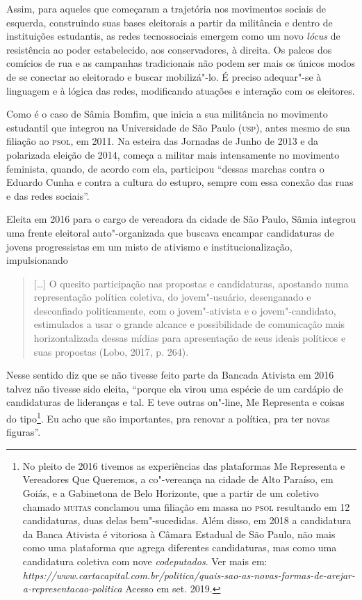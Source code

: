 Assim, para aqueles que começaram a trajetória nos movimentos sociais de
esquerda, construindo suas bases eleitorais a partir da militância e
dentro de instituições estudantis, as redes tecnossociais emergem como
um novo \emph{lócus} de resistência ao poder estabelecido, aos
conservadores, à direita. Os palcos dos comícios de rua e as campanhas
tradicionais não podem ser mais os únicos modos de se conectar ao
eleitorado e buscar mobilizá"-lo. É preciso adequar"-se à linguagem e à
lógica das redes, modificando atuações e interação com os eleitores.

Como é o caso de Sâmia Bomfim, que inicia a sua militância no movimento
estudantil que integrou na Universidade de São Paulo (\textsc{usp}), antes mesmo
de sua filiação ao \textsc{psol}, em 2011. Na esteira das Jornadas de Junho de
2013 e da polarizada eleição de 2014, começa a militar mais intensamente
no movimento feminista, quando, de acordo com ela, participou ``dessas
marchas contra o Eduardo Cunha e contra a cultura do estupro, sempre com
essa conexão das ruas e das redes sociais''.

Eleita em 2016 para o cargo de vereadora da cidade de São Paulo, Sâmia
integrou uma frente eleitoral auto"-organizada que buscava encampar
candidaturas de jovens progressistas em um misto de ativismo e
institucionalização, impulsionando

\begin{quote}
{[}\ldots{}{]} O quesito participação nas propostas e candidaturas, apostando
numa representação política coletiva, do jovem"-usuário, desenganado e
desconfiado politicamente, com o jovem"-ativista e o jovem"-candidato,
estimulados a usar o grande alcance e possibilidade de comunicação mais
horizontalizada dessas mídias para apresentação de seus ideais políticos
e suas propostas (Lobo, 2017, p. 264).
\end{quote}

Nesse sentido diz que se não tivesse feito parte da Bancada Ativista em
2016 talvez não tivesse sido eleita, ``porque ela virou uma espécie de
um cardápio de candidaturas de lideranças e tal. E teve outras on"-line,
Me Representa e coisas do tipo\footnote{No pleito de 2016 tivemos as
  experiências das plataformas Me Representa e Vereadores Que Queremos,
  a co"-vereança na cidade de Alto Paraíso, em Goiás, e a Gabinetona de
  Belo Horizonte, que a partir de um coletivo chamado \textsc{muitas} conclamou
  uma filiação em massa no \textsc{psol} resultando em 12 candidaturas, duas
  delas bem"-sucedidas. Além disso, em 2018 a candidatura da Banca
  Ativista é vitoriosa à Câmara Estadual de São Paulo, não mais como uma
  plataforma que agrega diferentes candidaturas, mas como uma
  candidatura coletiva com nove \emph{codeputados}. Ver mais em:
  \emph{https://www.cartacapital.com.br/politica/quais-sao-as-novas-formas-de-arejar-a-representacao-politica}
  Acesso em set. 2019.}. Eu acho que são importantes, pra renovar a
política, pra ter novas figuras''.

